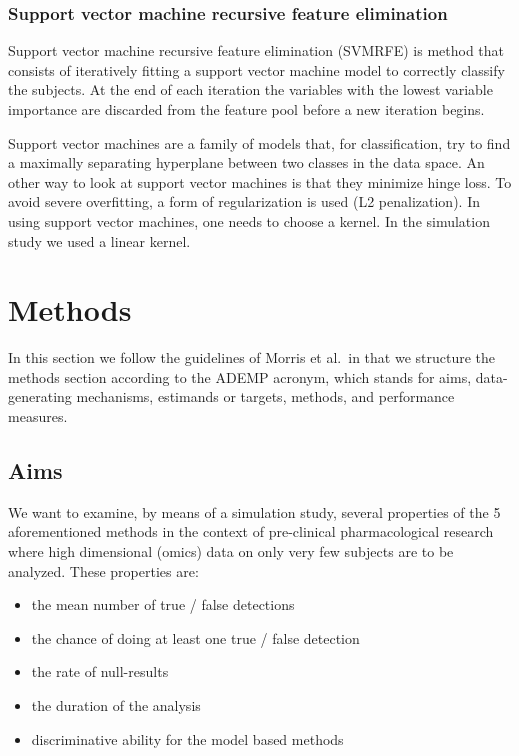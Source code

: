 \documentclass[
]{article}
\begin{document}
\hypertarget{intro-SVMRFE}{%
\subsubsection{Support vector machine recursive feature elimination}\label{intro-SVMRFE}}

Support vector machine recursive feature elimination (SVMRFE) is method that consists of iteratively fitting a support vector machine model to correctly classify the subjects. At the end of each iteration the variables with the lowest variable importance are discarded from the feature pool before a new iteration begins.

Support vector machines are a family of models that, for classification, try to find a maximally separating hyperplane between two classes in the data space. An other way to look at support vector machines is that they minimize hinge loss. To avoid severe overfitting, a form of regularization is used (L2 penalization). In using support vector machines, one needs to choose a kernel. In the simulation study we used a linear kernel.

\newpage

\hypertarget{methods}{%
\section{Methods}\label{methods}}

In this section we follow the guidelines of Morris et al.~in that we structure the methods section according to the ADEMP acronym, which stands for aims, data-generating mechanisms, estimands or targets, methods, and performance measures.

\hypertarget{aims}{%
\subsection{Aims}\label{aims}}

We want to examine, by means of a simulation study, several properties of the 5 aforementioned methods in the context of pre-clinical pharmacological research where high dimensional (omics) data on only very few subjects are to be analyzed. These properties are:

\begin{itemize}
\item
  the mean number of true / false detections
\item
  the chance of doing at least one true / false detection
\item
  the rate of null-results
\item
  the duration of the analysis
\item
  discriminative ability for the model based methods
\end{itemize}
\end{document}
